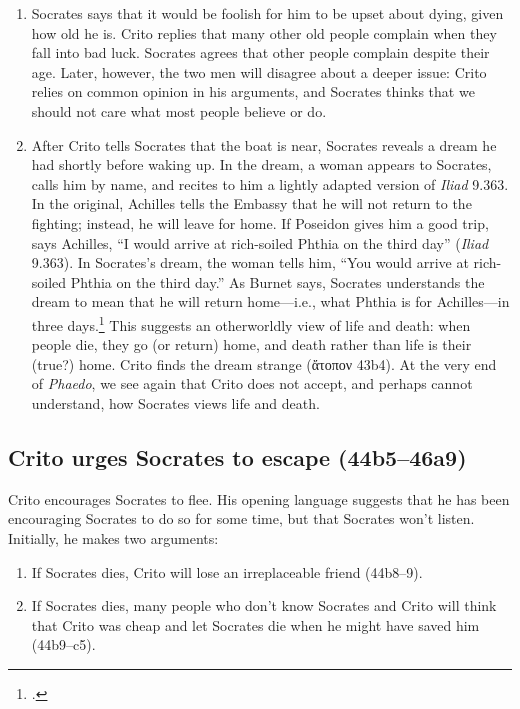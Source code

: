 \documentclass[12pt,letterpaper]{article}
\begin{document}
\begin{enumerate}
    \item Socrates says that it would be foolish for him to be upset about dying, given how old he is. Crito replies that many other old people complain when they fall into bad luck. Socrates agrees that other people complain despite their age. Later, however, the two men will disagree about a deeper issue: Crito relies on common opinion in his arguments, and Socrates thinks that we should not care what most people believe or do.

    \item After Crito tells Socrates that the boat is near, Socrates reveals a dream he had shortly before waking up. In the dream, a woman appears to Socrates, calls him by name, and recites to him a lightly adapted version of \textit{Iliad} 9.363. In the original, Achilles tells the Embassy that he will not return to the fighting; instead, he will leave for home. If Poseidon gives him a good trip, says Achilles, ``I would arrive at rich-soiled Phthia on the third day'' (\textit{Iliad} 9.363). In Socrates's dream, the woman tells him, ``You would arrive at rich-soiled Phthia on the third day.'' As Burnet says, Socrates understands the dream to mean that he will return home---i.e., what Phthia is for Achilles---in three days.\footcite[][on 44b2]{burnet1924-euthyphro-apology-crito} This suggests an otherworldly view of life and death: when people die, they go (or return) home, and death rather than life is their (true?) home. Crito finds the dream strange (\textgreek{ἄτοπον} 43b4). At the very end of \textit{Phaedo}, we see again that Crito does not accept, and perhaps cannot understand, how Socrates views life and death.
\end{enumerate}


\subsection*{Crito urges Socrates to escape (44b5--46a9)}

Crito encourages Socrates to flee. His opening language suggests that he has been encouraging Socrates to do so for some time, but that Socrates won't listen. Initially, he makes two arguments:

\begin{enumerate}

    \item If Socrates dies, Crito will lose an irreplaceable friend
        (44b8--9).

    \item If Socrates dies, many people who don't know Socrates and Crito will think that Crito was cheap and let Socrates die when he might have saved him (44b9--c5).

\end{enumerate}
\end{document}
